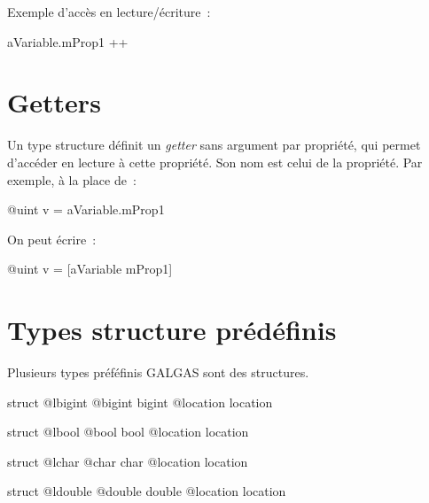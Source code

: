 Exemple d'accès en lecture/écriture~:
\begin{galgas3}
aVariable.mProp1 ++
\end{galgas3}





\section{Getters}

Un type structure définit un \emph{getter} sans argument par propriété, qui permet d'accéder en lecture à cette propriété. Son nom est celui de la propriété. Par exemple, à la place de~:
\begin{galgas3}
@uint v = aVariable.mProp1
\end{galgas3}

On peut écrire~:
\begin{galgas3}
@uint v = [aVariable mProp1]
\end{galgas3}



\section{Types structure prédéfinis}

Plusieurs types préféfinis GALGAS sont des structures.


\begin{galgas3}
struct @lbigint {
  @bigint bigint
  @location location
}
\end{galgas3}




\begin{galgas3}
struct @lbool {
  @bool bool
  @location location
}
\end{galgas3}




\begin{galgas3}
struct @lchar {
  @char char
  @location location
}
\end{galgas3}



\begin{galgas3}
struct @ldouble {
  @double double
  @location location
}
\end{galgas3}







